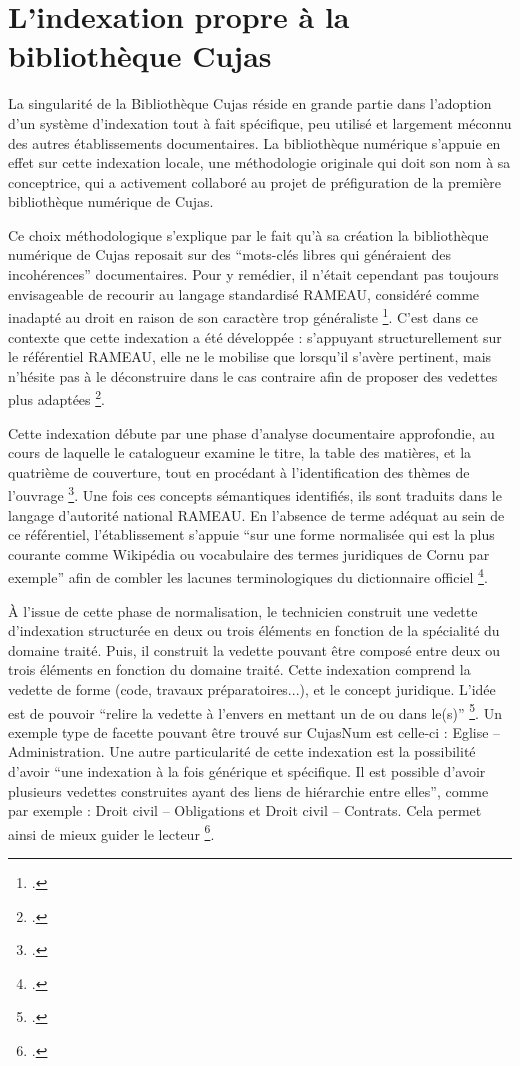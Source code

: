 \section{L’indexation propre à la bibliothèque Cujas}
La singularité de la Bibliothèque Cujas réside en grande partie dans l'adoption d'un système d'indexation tout à fait spécifique, peu utilisé et largement méconnu des autres établissements documentaires. La bibliothèque numérique s'appuie en effet sur cette indexation locale, une méthodologie originale qui doit son nom à sa conceptrice, qui a activement collaboré au projet de préfiguration de la première bibliothèque numérique de Cujas. 

Ce choix méthodologique s'explique par le fait qu'à sa création la bibliothèque numérique de Cujas reposait sur des \enquote{mots-clés libres qui généraient des incohérences} documentaires. Pour y remédier, il n'était cependant pas toujours envisageable de recourir au langage standardisé \ac{RAMEAU}, considéré comme inadapté au droit en raison de son caractère trop généraliste \footcite{cecilebolardLindexationPistePour2022}. C'est dans ce contexte que cette indexation a été développée : s'appuyant structurellement sur le référentiel \ac{RAMEAU}, elle ne le mobilise que lorsqu'il s'avère pertinent, mais n'hésite pas à le déconstruire dans le cas contraire afin de proposer des vedettes plus adaptées \footcite{2013_Num_Indexation_manuel_FHdocEspaceTravail}. 

Cette indexation débute par une phase d'analyse documentaire approfondie, au cours de laquelle le catalogueur examine le titre, la table des matières, et la quatrième de couverture, tout en procédant à l'identification des thèmes de l'ouvrage \footcite{2013_Num_Indexation_manuel_FHdocEspaceTravail}. Une fois ces concepts sémantiques identifiés, ils sont traduits dans le langage d'autorité national \ac{RAMEAU}. En l'absence de terme adéquat au sein de ce référentiel, l'établissement s'appuie \enquote{sur une forme normalisée qui est la plus courante comme Wikipédia ou vocabulaire des termes juridiques de Cornu par exemple} afin de combler les lacunes terminologiques du dictionnaire officiel \footcite{2013_Num_Indexation_manuel_FHdocEspaceTravail}. 

À l'issue de cette phase de normalisation, le technicien construit une vedette d'indexation structurée en deux ou trois éléments en fonction de la spécialité du domaine traité. Puis, il construit la vedette pouvant être composé entre deux ou trois éléments en fonction du domaine traité. Cette indexation comprend la vedette de forme (code, travaux préparatoires...), et le concept juridique. L'idée est de pouvoir \enquote{relire la vedette à l'envers en mettant un de ou dans le(s)} \footcite{2013_Num_Indexation_manuel_FHdocEspaceTravail}. Un exemple type de facette pouvant être trouvé sur CujasNum est celle-ci : Eglise -- Administration. Une autre particularité de cette indexation est la possibilité d'avoir \enquote{une indexation à la fois générique et spécifique. Il est possible d'avoir plusieurs vedettes construites ayant des liens de hiérarchie entre elles}, comme par exemple : Droit civil -- Obligations et Droit civil -- Contrats. Cela permet ainsi de mieux guider le lecteur \footcite{2013_Num_Indexation_manuel_FHdocEspaceTravail}.

